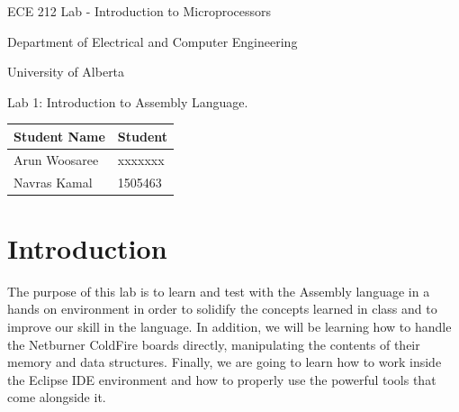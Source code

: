 \documentclass[letterpaper]{article}
\begin{document}
  \begin{titlepage}
    \begin{center}

      \LARGE
      ECE 212 Lab - Introduction to Microprocessors

      Department of Electrical and Computer Engineering

      University of Alberta

      \vspace{2cm}

      Lab 1: Introduction to Assembly Language.

      \vspace{5cm}
      \Large

      \begin{tabular}{ | m{5cm} | m{5cm} | }
        \hline
        Student Name & Student \\
        \hline
        Arun Woosaree & xxxxxxx \\
        \hline
        Navras Kamal & 1505463 \\
        \hline
      \end{tabular}




    \end{center}
\end{titlepage}


\tableofcontents

\newpage

\section{Introduction}
  The purpose of this lab is to learn and test with the Assembly language in a hands on environment
  in order to solidify the concepts learned in class and to improve our skill in the language.  In
  addition, we will be learning how to handle the Netburner ColdFire boards directly, manipulating
  the contents of their memory and data structures.  Finally, we are going to learn how to work inside
  the Eclipse IDE environment and how to properly use the powerful tools that come alongside it.
\end{document}
